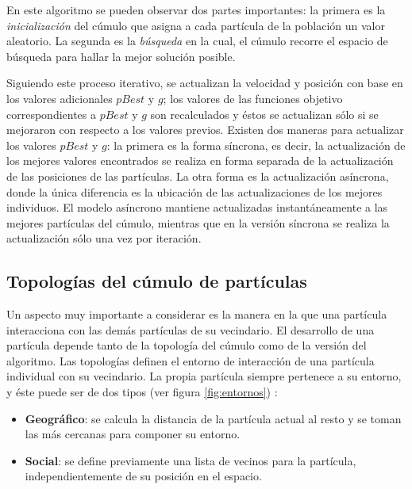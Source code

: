 	En este algoritmo se pueden observar dos partes importantes: la primera es la \textit{inicializaci\'on} del c\'umulo que asigna a cada 
	part\'icula de la poblaci\'on un valor aleatorio. La segunda es la \DIFaddbegin {}\DIFaddend \textit{b\'usqueda} en la cual, el c\'umulo recorre el espacio
	de b\'usqueda para hallar la mejor soluci\'on posible. 

	Siguiendo este proceso iterativo, se actualizan la velocidad y posici\'on con base en los valores adicionales $pBest$ y $g$; los  
	valores de las funciones objetivo correspondientes a $pBest$ y $g$ son recalculados y \'estos se actualizan s\'olo si se mejoraron 
	con respecto a los valores previos. Existen dos maneras para actualizar los valores $pBest$ y $g$: la primera es la forma s\'incrona, es 
	decir, la actualizaci\'on de los mejores valores encontrados se realiza en forma 
	separada de la actualizaci\'on de las posiciones de las part\'iculas. La otra forma es la actualizaci\'on as\'incrona, donde la \'unica 
	diferencia es la ubicaci\'on de las actualizaciones de los mejores individuos. El modelo as\'incrono mantiene actualizadas 
	instant\'aneamente a las mejores part\'iculas del c\'umulo, mientras que en la versi\'on s\'incrona se realiza la actualizaci\'on s\'olo 
	una vez por iteraci\'on.

    \subsection{Topolog\'ias del c\'umulo de part\'iculas}

   Un aspecto muy importante a considerar es la manera en la que una part\'icula interacciona con las dem\'as part\'iculas de su 
   vecindario. 
   El desarrollo de una part\'icula depende tanto de la topolog\'ia del c\'umulo como de la versi\'on del algoritmo. Las topolog\'ias definen 
   el entorno de interacci\'on de una part\'icula individual con su vecindario. La propia part\'icula siempre pertenece a su entorno, y \'este
   puede ser de dos tipos (ver figura \ref{fig:entornos}) \cite{JKennedySI}:

   \begin{itemize}
    \item \textbf{Geogr\'afico}: se calcula la distancia de la part\'icula actual al resto y se toman las m\'as cercanas para componer su entorno.
    \item \textbf{Social}: se define previamente una lista de vecinos para la part\'icula, independientemente de su posici\'on en el espacio.
   \end{itemize}

